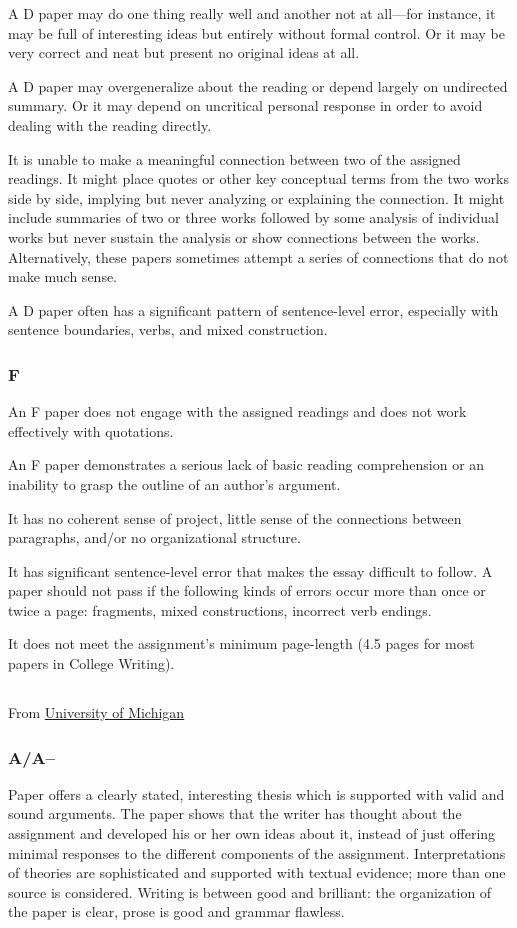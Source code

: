 \documentclass{article}
\begin{document}
A D paper may do one thing really well and another not at all—for instance, it may be full of interesting ideas but entirely without formal control.  Or it may be very correct and neat but present no original ideas at all. 

A D paper may overgeneralize about the reading or depend largely on undirected summary. Or it may depend on uncritical personal response in order to avoid dealing with the reading directly.

It is unable to make a meaningful connection between two of the assigned readings. It might place quotes or other key conceptual terms from the two works side by side, implying but never analyzing or explaining the connection. It might include summaries of two or three works followed by some analysis of individual works but never sustain the analysis or show connections between the works. Alternatively, these papers sometimes attempt a series of connections that do not make much sense.

A D paper often has a significant pattern of sentence-level error, especially with sentence boundaries, verbs, and mixed construction. 

\subsubsection{F}
An F paper does not engage with the assigned readings and does not work effectively with quotations.

An F paper demonstrates a serious lack of basic reading comprehension or an inability to grasp the outline of an author's argument.

It has no coherent sense of project, little sense of the connections between paragraphs, and/or no organizational structure.

It has significant sentence-level error that makes the essay difficult to follow. A paper should not pass if the following kinds of errors occur more than once or twice a page: fragments, mixed constructions, incorrect verb endings.

It does not meet the assignment’s minimum page-length (4.5 pages for most papers in College Writing). 

\subsection{}
From \href{http://www-personal.umich.edu/~mmanty/teaching/grading.html}{University of Michigan}
\subsubsection{A/A–} Paper offers a clearly stated, interesting thesis which is supported with valid and sound arguments. The paper shows that the writer has thought about the assignment and developed his or her own ideas about it, instead of just offering minimal responses to the different components of the assignment. Interpretations of theories are sophisticated and supported with textual evidence; more than one source is considered. Writing is between good and brilliant: the organization of the paper is clear, prose is good and grammar flawless.
\end{document}
